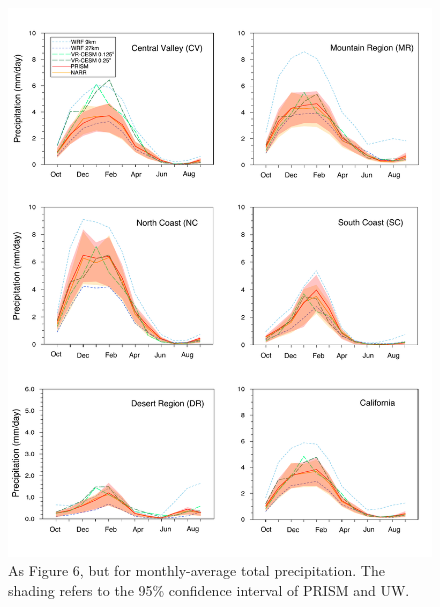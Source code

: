 \documentclass[draft,ms]{agutex}   %
\begin{document}
\begin{figure}
\begin{center}
\includegraphics[width=6in]{trd_pr_allzones.pdf}
\end{center}
\caption{As Figure 6, but for monthly-average total precipitation. The shading refers to the 95\% confidence interval of PRISM and UW.} \label{fig:Figure 11}
\end{figure}


\end{document}
